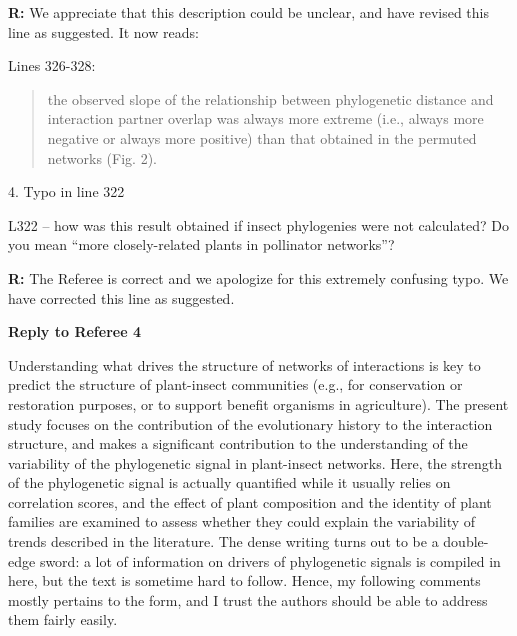 \documentclass[12pt]{letter}
\newenvironment{refquote}{\bigskip \begin{it}}{\end{it}\smallskip}
\begin{document}
		\textbf{R:} We appreciate that this description could be unclear, and have revised this line as suggested. It now reads:

		Lines 326-328:

		\begin{quotation}

			the observed 
			slope of the relationship between phylogenetic distance and interaction 
			partner overlap was always more extreme (i.e., always more negative or 
			always more positive) than that obtained in the permuted networks (Fig. 2).

	    \end{quotation}


	4. Typo in line 322 
		
		\begin{refquote}
			L322 – how was this result obtained if insect phylogenies were not calculated? Do you mean “more closely-related plants in pollinator networks”?
		\end{refquote}


		\textbf{R:} The Referee is correct and we apologize for this extremely confusing typo. We have corrected this line as suggested.


\clearpage


{\Large \bf Reply to Referee 4} 

	\begin{refquote}
		Understanding what drives the structure of networks of interactions is key to predict the structure of plant-insect communities (e.g., for conservation or restoration purposes, or to support benefit organisms in agriculture).
		The present study focuses on the contribution of the evolutionary history to the interaction structure, and makes a significant contribution to the understanding of the variability of the phylogenetic signal in plant-insect networks. Here, the strength of the phylogenetic signal is actually quantified while it usually relies on correlation scores, and the effect of plant composition and the identity of plant families are examined to assess whether they could explain the variability of trends described in the literature.
		The dense writing turns out to be a double-edge sword: a lot of information on drivers of phylogenetic signals is compiled in here, but the text is sometime hard to follow. Hence, my following comments mostly pertains to the form, and I trust the authors should be able to address them fairly easily.
	\end{refquote}
\end{document}
